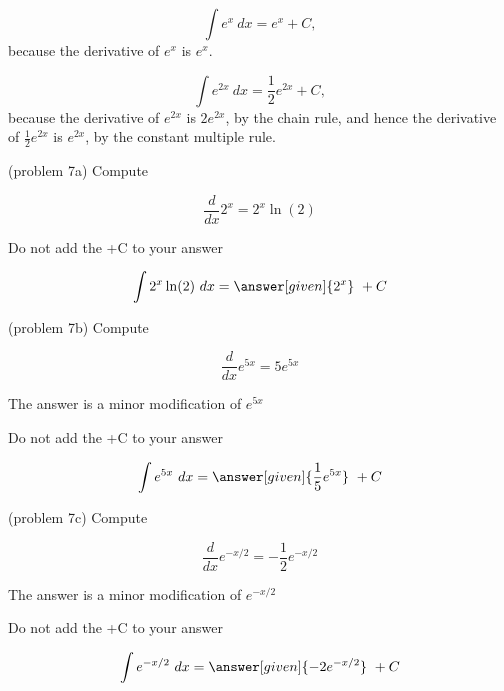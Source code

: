 \documentclass{ximera}
\begin{document}
\begin{example}[example 7]
\[
\int e^x \ dx = e^x + C,
\]
because the derivative of $e^x$ is $e^x$.

\end{example}

\begin{example} %
\[
\int e^{2x} \ dx = \frac12 e^{2x} + C,
\]
because the derivative of $e^{2x}$ is $2e^{2x}$, by the chain rule,
and hence the derivative of $\frac12 e^{2x}$ is $e^{2x}$, by the constant multiple rule.

\end{example}

\begin{problem}(problem 7a)
Compute 

\begin{hint}
\[
\frac{d}{dx} 2^x = 2^x \ln(2)
\]
\end{hint}
\begin{hint}
\begin{center}
Do not add the +C to your answer
\end{center}
\end{hint}

\[
\int 2^x \ln(2) \ dx =
\answer[given]{2^x} \ + C
\]
\end{problem}

\begin{problem}(problem 7b)
Compute 

\begin{hint}
\[
\frac{d}{dx} e^{5x} = 5e^{5x}
\]
\end{hint}
\begin{hint}
The answer is a minor modification of $e^{5x}$
\end{hint}
\begin{hint}
\begin{center}
Do not add the +C to your answer
\end{center}
\end{hint}

\[
\int e^{5x} \ dx =
\answer[given]{\frac15 e^{5x}} \ + C
\]
\end{problem}

\begin{problem}(problem 7c)
Compute 

\begin{hint}
\[
\frac{d}{dx} e^{-x/2} = -\frac12 e^{-x/2}
\]
\end{hint}
\begin{hint}
The answer is a minor modification of $e^{-x/2}$
\end{hint}
\begin{hint}
\begin{center}
Do not add the +C to your answer
\end{center}
\end{hint}

\[
\int e^{-x/2} \ dx =
\answer[given]{-2 e^{-x/2}} \ + C
\]
\end{problem}
\end{document}
